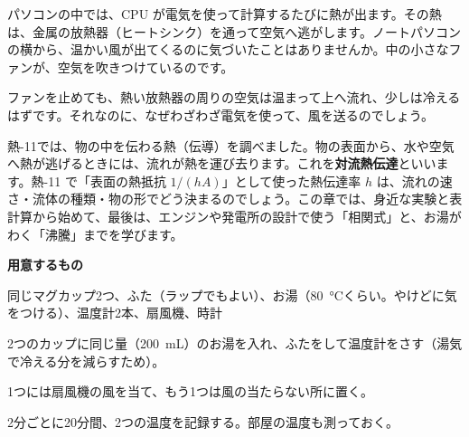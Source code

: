 \begin{hatena}
\noindent\begin{minipage}[c]{0.56\linewidth}\raggedright
パソコンの中では、CPU が電気を使って計算するたびに熱が出ます。その熱は、金属の放熱器（ヒートシンク）を通って空気へ逃がします。ノートパソコンの横から、温かい風が出てくるのに気づいたことはありませんか。中の小さなファンが、空気を吹きつけているのです。

ファンを止めても、熱い放熱器の周りの空気は温まって上へ流れ、少しは冷えるはずです。それなのに、なぜわざわざ電気を使って、風を送るのでしょう。
\end{minipage}\hfill
\begin{minipage}[c]{0.4\linewidth}\centering
{}
\end{minipage}
\end{hatena}

\noindent 熱-11では、物の中を伝わる熱（伝導）を調べました。物の表面から、水や空気へ熱が逃げるときには、流れが熱を運び去ります。これを\textbf{対流熱伝達}といいます。熱-11 で「表面の熱抵抗 $1/(hA)$」として使った熱伝達率 $h$ は、流れの速さ・流体の種類・物の形でどう決まるのでしょう。この章では、身近な実験と表計算から始めて、最後は、エンジンや発電所の設計で使う「相関式」と、お湯がわく「沸騰」までを学びます。

\begin{yattemiyou}
\textbf{用意するもの}\par
同じマグカップ2つ、ふた（ラップでもよい）、お湯（\qty{80}{\celsius}くらい。やけどに気をつける）、温度計2本、扇風機、時計\par\vspace{2pt}
\begin{enumerate}[label={\bkcircled[bkGreen]{\arabic*}}, leftmargin=2.4\zw, itemsep=1pt, topsep=0pt]
\item 2つのカップに同じ量（\qty{200}{mL}）のお湯を入れ、ふたをして温度計をさす（湯気で冷える分を減らすため）。
\item 1つには扇風機の風を当て、もう1つは風の当たらない所に置く。
\item 2分ごとに20分間、2つの温度を記録する。部屋の温度も測っておく。
\end{enumerate}
\end{yattemiyou}

